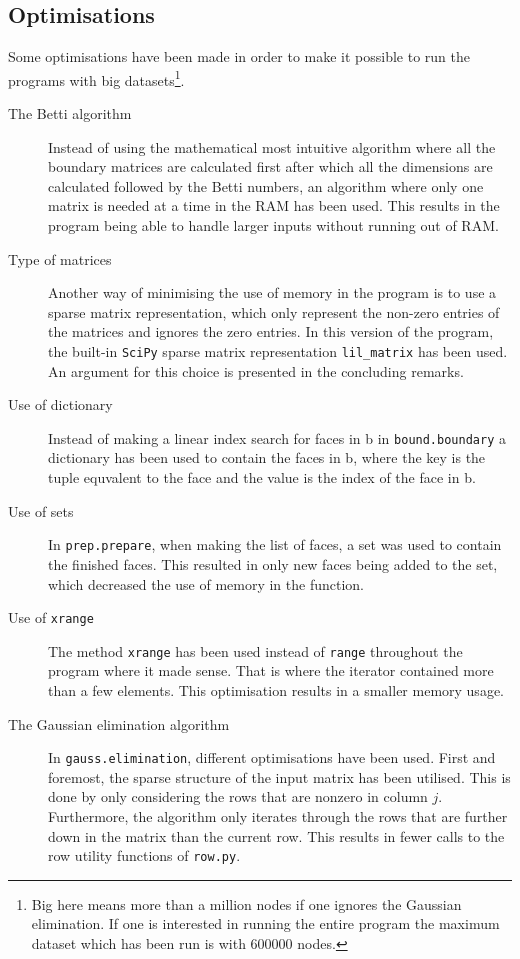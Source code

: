 \documentclass[11pt,a4paper,twoside]{report}
\begin{document}
\subsection{Optimisations}
Some optimisations have been made in order to make it possible to run the programs with big datasets\footnote{Big here means more than a million nodes if one ignores the Gaussian elimination. If one is interested in running the entire program the maximum dataset which has been run is with 600000 nodes.}.
\begin{description}
\item[The Betti algorithm] Instead of using the mathematical most intuitive algorithm where all the boundary matrices are calculated first after which all the dimensions are calculated followed by the Betti numbers, an algorithm where only one matrix is needed at a time in the RAM has been used. This results in the program being able to handle larger inputs without running out of RAM.
\item[Type of matrices] Another way of minimising the use of memory in the program is to use a sparse matrix representation, which only represent the non-zero entries of the matrices and ignores the zero entries. In this version of the program, the built-in \texttt{SciPy} sparse matrix representation \texttt{lil\_matrix} has been used. An argument for this choice is presented in the concluding remarks.
\item[Use of dictionary] Instead of making a linear index search for faces in b in \texttt{bound.boundary} a dictionary has been used to contain the faces in b, where the key is the tuple equvalent to the face and the value is the index of the face in b.
\item[Use of sets] In \texttt{prep.prepare}, when making the list of faces, a set was used to contain the finished faces. This resulted in only new faces being added to the set, which decreased the use of memory in the function.
\item[Use of \texttt{xrange}] The method \texttt{xrange} has been used instead of \texttt{range} throughout the program where it made sense. That is where the iterator contained more than a few elements. This optimisation results in a smaller memory usage.
\item[The Gaussian elimination algorithm] In \texttt{gauss.elimination}, different optimisations have been used. First and foremost, the sparse structure of the input matrix has been utilised. This is done by only considering the rows that are nonzero in column $j$. Furthermore, the algorithm only iterates through the rows that are further down in the matrix than the current row. This results in fewer calls to the row utility functions of \texttt{row.py}.

\end{description}
\end{document}

